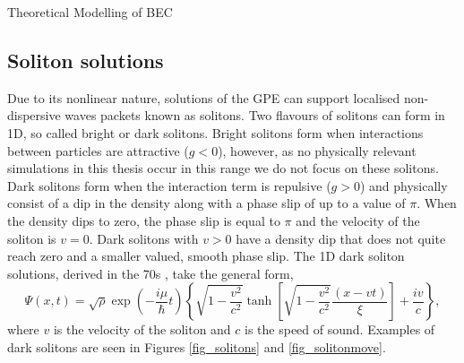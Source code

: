 \begin{chapter}{\label{cha:theoretical_model}Theoretical Modelling of BEC}
	\subsection{\label{section:soliton} Soliton solutions}
	Due to its nonlinear nature, solutions of the GPE can support localised non-dispersive waves packets known as solitons. Two flavours of solitons can form in 1D, so called bright or dark solitons. Bright solitons form when interactions between particles are attractive ($g<0$), however, as no physically relevant simulations in this thesis occur in this range we do not focus on these solitons. Dark solitons form when the interaction term is repulsive ($g>0$) and physically consist of a dip in the density along with a phase slip of up to a value of $\pi$. When the density dips to zero, the phase slip is equal to $\pi$ and the velocity of the soliton is $v=0$. Dark solitons with $v>0$ have a density dip that does not quite reach zero and a smaller valued, smooth phase slip. The 1D dark soliton solutions, derived in the 70s \cite{zakharov72,zakharov73}, take the general form,
	\begin{equation}
		\Psi(x,t) = \sqrt{\rho}\exp\left(-\frac{i\mu}{\hbar}t\right)\left\{ \sqrt{1-\frac{v^2}{c^2}} \tanh\left[ \sqrt{1-\frac{v^2}{c^2}}\frac{(x-vt)}{\xi} \right ] + \frac{iv}{c}  \right \} ,
	\end{equation}
	where $v$ is the velocity of the soliton and $c$ is the speed of sound. Examples of dark solitons are seen in Figures \ref{fig_solitons} and \ref{fig_solitonmove}.
	\begin{figure}
	\centering
\end{figure}
\end{chapter}
